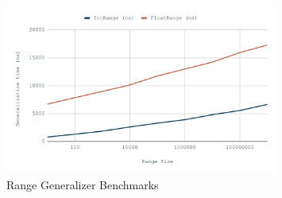 \begin{figure}[ht]
    \centering
    \includegraphics[width=0.8\textwidth]{images/range.png}
    \caption{Range Generalizer Benchmarks}\label{fig:range_bm}
\end{figure}